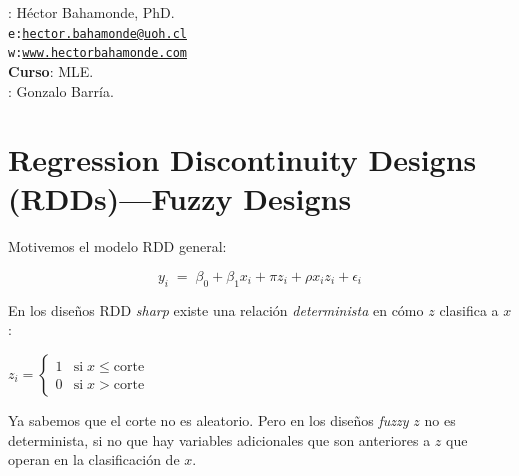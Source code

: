 \documentclass[onesided]{article}\usepackage[]{graphicx}\usepackage[]{color}
\begin{document}











\hspace{-5mm}{\bf Profesor}: H\'ector Bahamonde, PhD.\\
\texttt{e:}\href{mailto:hector.bahamonde@uoh.cl}{\texttt{hector.bahamonde@uoh.cl}}\\
\texttt{w:}\href{http://www.hectorbahamonde.com}{\texttt{www.hectorbahamonde.com}}\\
{\bf Curso}: MLE.\\
\hspace{-5mm}{\bf TA}: Gonzalo Barr\'ia.


\section*{Regression Discontinuity Designs (RDDs)---Fuzzy Designs}

Motivemos el modelo RDD general:

\begin{equation}\label{eq:1}
y_{i} \;=\; \beta_{0} + \beta_{1}x_{i} + \pi z_{i} + \rho x_{i}z_{i} + \epsilon_{i}
\end{equation}

En los dise\~nos RDD \emph{sharp} existe una relaci\'on \emph{determinista} en c\'omo $z$ clasifica a $x$ \parencite[202]{Hahn2001a}:


\begin{center}
$z_{i} = \left \{ 
\begin{matrix}\label{det:1}
     1 & \text{si} \; x \le \text{corte} \\
     0 & \text{si} \; x > \text{corte}

\end{matrix}\right. $
\end{center}

Ya sabemos que el corte no es aleatorio. Pero en los dise\~nos \emph{fuzzy} $z$ no es determinista, si no que hay variables adicionales que son anteriores a $z$ que operan en la clasificaci\'on de $x$. 
\end{document}
